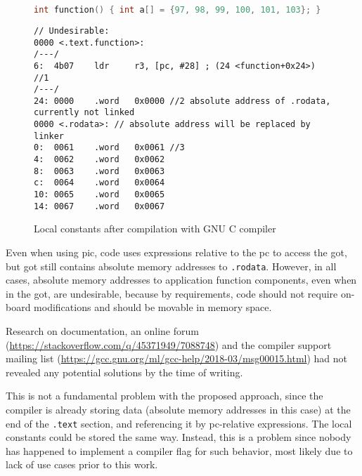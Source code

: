 \begin{figure} [htb]
\begin{lstlisting}[language=C]
int function() { int a[] = {97, 98, 99, 100, 101, 103}; }
\end{lstlisting}
\begin{lstlisting}[style=asm]
// Undesirable:
0000 <.text.function>:
/---/
6:  4b07    ldr     r3, [pc, #28] ; (24 <function+0x24>) //1
/---/
24: 0000    .word   0x0000 //2 absolute address of .rodata, currently not linked
0000 <.rodata>: // absolute address will be replaced by linker
0:  0061    .word   0x0061 //3
4:  0062    .word   0x0062
8:  0063    .word   0x0063
c:  0064    .word   0x0064
10: 0065    .word   0x0065
14: 0067    .word   0x0067
\end{lstlisting}
\caption{Local constants after compilation with GNU C compiler}
\label{fig:rodata}
\end{figure}

Even when using \gls{pic}, code uses expressions relative to the \gls{pc} to access the \gls{got}, but \gls{got} still contains absolute memory addresses to \texttt{.rodata}. However, in all cases, absolute memory addresses to application function components, even when in the \gls{got}, are undesirable, because by requirements, code should not require on-board modifications and should be movable in memory space.

Research on documentation, an online forum (\url{https://stackoverflow.com/q/45371949/7088748}) and the compiler support mailing list (\url{https://gcc.gnu.org/ml/gcc-help/2018-03/msg00015.html}) had not revealed any potential solutions by the time of writing.

This is not a fundamental problem with the proposed approach, since the compiler is already storing data (absolute memory addresses in this case) at the end of the \texttt{.text} section, and referencing it by \gls{pc}-relative expressions. The local constants could be stored the same way. Instead, this is a problem since nobody has happened to implement a compiler flag for such behavior, most likely due to lack of use cases prior to this work.
